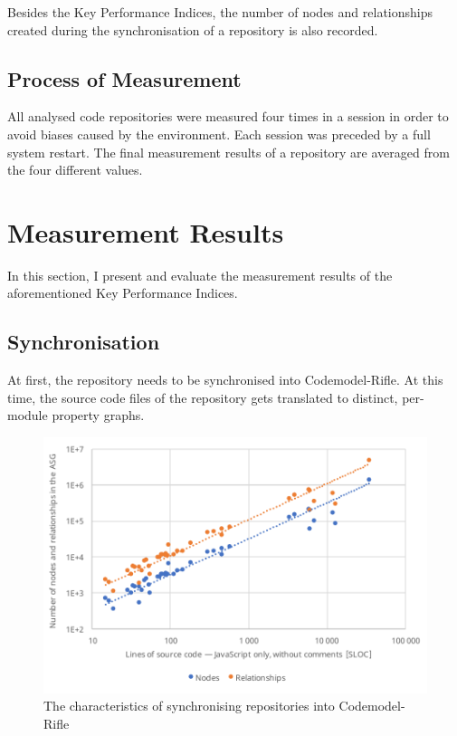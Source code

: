 Besides the Key Performance Indices, the number of nodes and relationships created during the synchronisation of a repository is also recorded.


\subsection{Process of Measurement}

All analysed code repositories were measured four times in a session in order to avoid biases caused by the environment. Each session was preceded by a full system restart. The final measurement results of a repository are averaged from the four different values.


\section{Measurement Results}

In this section, I present and evaluate the measurement results of the aforementioned Key Performance Indices.


\subsection{Synchronisation}

At first, the repository needs to be synchronised into Codemodel-Rifle. At this time, the source code files of the repository gets translated to distinct, per-module property graphs.

\begin{figure}[!htb]
	\centerfloat
	\includegraphics[width=\textwidth,clip]{figures/measurement-nodes-relationships-sloc.pdf}
	\caption{The characteristics of synchronising repositories into Codemodel-Rifle}
	\label{fig:measurement-nodes-relationships-sloc}
\end{figure}

